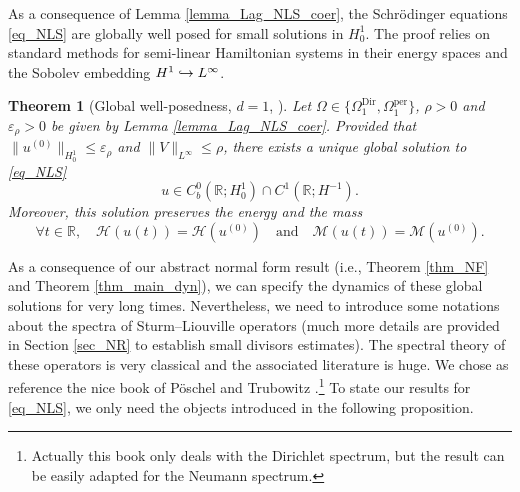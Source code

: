 \documentclass[11pt]{article}
\newcommand{\ie}{i.e.,\xspace}
\newcommand\hto{\mathrel{\lhook\joinrel\to}}
\newtheorem{theorem}{Theorem}[section]
\theoremstyle{definition}
\begin{document}
As a consequence of Lemma \ref{lemma_Lag_NLS_coer}, the Schrödinger equations \eqref{eq_NLS} are globally well posed for small solutions in $H^1_0$.
The proof relies on standard methods for semi-linear Hamiltonian systems in their energy spaces and the Sobolev embedding $H^1 \hto L^{\infty}$.
\begin{theorem}[Global well-posedness, $d=1$, {\cite[Cor.\,3.5.3, p.\,77]{Caz03}}]
\label{thm_GWP_NLS_1d}
Let $\Omega \in \{ \Omega^{\mathrm{Dir}}_1, \Omega^{\mathrm{per}}_1 \}$, $\rho >0$ and $\varepsilon_{\rho}>0$ be given by Lemma \ref{lemma_Lag_NLS_coer}. Provided that $\|u^{(0)} \|_{H^1_0} \leq \varepsilon_{\rho}$ and $\| V\|_{L^\infty} \leq \rho$, there exists a unique global solution to \eqref{eq_NLS}
\[
u \in C^0_b(\mathbb{R}; H^1_0) \cap C^1(\mathbb{R};H^{-1}).
\]
Moreover, this solution preserves the energy and the mass
\[
\forall t\in \mathbb{R}, \quad \mathcal{H}(u(t)) = \mathcal{H}(u^{(0)}) \quad \text{and} \quad \mathcal{M}(u(t)) = \mathcal{M}(u^{(0)}).
\]
\end{theorem}

As a consequence of our abstract normal form result (\ie Theorem \ref{thm_NF} and Theorem \ref{thm_main_dyn}), we can specify the dynamics of these global solutions for very long times. Nevertheless, we need to introduce some notations about the spectra of Sturm--Liouville operators (much more details are provided in Section \ref{sec_NR} to establish small divisors estimates). The spectral theory of these operators is very classical and the associated literature is huge. We chose as reference the nice book of Pöschel and Trubowitz \cite{PT}.\footnote{Actually this book only deals with the Dirichlet spectrum, but the result can be easily adapted for the Neumann spectrum.} To state our results for \eqref{eq_NLS}, we only need the objects introduced in the following proposition.
\end{document}
